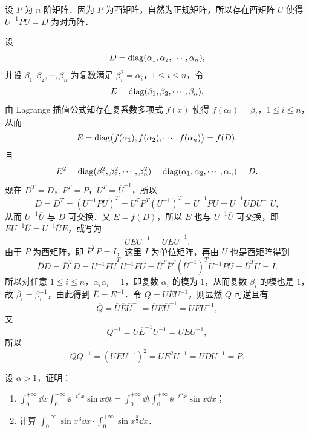 \begin{solution}
设 $P$ 为 $n$ 阶矩阵．因为 $P$ 为酉矩阵，自然为正规矩阵，所以存在酉矩阵 $U$ 使得 $U^{-1}PU=D$ 为对角阵．

设
\[
  D=\operatorname{diag}(\alpha_1,\alpha_2,\cdots,\alpha_n),
\]
并设 $\beta_1,\beta_2,\cdots,\beta_n$ 为复数满足 $\beta_i^2=\alpha_i$，$1\le i\le n$，令
\[
  E=\operatorname{diag}(\beta_1,\beta_2,\cdots,\beta_n).
\]
由 Lagrange 插值公式知存在复系数多项式 $f(x)$ 使得 $f(\alpha_i)=\beta_i$，$1\le i\le n$，从而
\[
  E=\operatorname{diag}\bigl(f(\alpha_1),f(\alpha_2),\cdots,f(\alpha_n)\bigr)=f(D),
\]
且
\[
  E^2=\operatorname{diag}(\beta_1^2,\beta_2^2,\cdots,\beta_n^2)=\operatorname{diag}(\alpha_1,\alpha_2,\cdots,\alpha_n)=D.
\]
现在 $D^T=D$，$P^T=P$，$U^T=\overline{U}^{-1}$，所以
\[
  D=D^T=(U^{-1}PU)^T=U^TP^T(U^{-1})^T
  =\overline{U}^{-1}P\overline{U}=\overline{U}^{-1}UDU^{-1}\overline{U},
\]
从而 $U^{-1}\overline{U}$ 与 $D$ 可交换．又 $E=f(D)$，所以 $E$ 也与 $U^{-1}\overline{U}$ 可交换，即 $EU^{-1}\overline{U}=U^{-1}\overline{U}E$，或写为
\[
  UEU^{-1}=\overline{U}E\overline{U}^{-1}.
\]
由于 $P$ 为酉矩阵，即 $\overline{P}^TP=I$，这里 $I$ 为单位矩阵，再由 $U$ 也是酉矩阵得到
\[
  \overline{D}D=\overline{D}^TD=\overline{U^{-1}PU}^TU^{-1}PU
  =\overline{U}^T\overline{P}^T(\overline{U}^{-1})^TU^{-1}PU=\overline{U}^TU=I.
\]
所以对任意 $1\le i\le n$，$\overline{\alpha}_i\alpha_i=1$，即复数 $\alpha_i$ 的模为 $1$，从而复数 $\beta_i$ 的模也是 $1$，故 $\overline{\beta}_i=\beta_i^{-1}$，由此得到 $\overline{E}=E^{-1}$．令 $Q=U\overline{E}U^{-1}$，则显然 $Q$ 可逆且有
\[
  \overline{Q}=\overline{U}\overline{\overline{E}}\overline{U}^{-1}
  =\overline{U}E\overline{U}^{-1}=UEU^{-1},
\]
又
\[
  Q^{-1}=U\overline{E}^{-1}U^{-1}=UEU^{-1},
\]
所以
\[
  \overline{Q}Q^{-1}=(UEU^{-1})^2=UE^2U^{-1}=UDU^{-1}=P.
\]
\end{solution}

设 $\alpha>1$，证明：
\begin{enumerate}[label=(\arabic*)]
  \item $\displaystyle\int_0^{+\infty}\dd x\int_0^{+\infty}\ee^{-t^\alpha x}\sin x\dd t=\int_0^{+\infty}\dd t\int_0^{+\infty}\ee^{-t^\alpha x}\sin x\dd x$；
  \item 计算 $\displaystyle\int_0^{+\infty}\sin x^3\dd x\cdot\int_0^{+\infty}\sin x^{\frac{3}{2}}\dd x$．
\end{enumerate}

